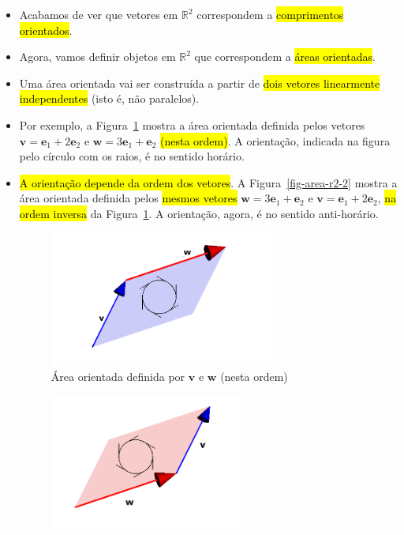 \documentclass[
  letterpaper,
  DIV=11,
  numbers=noendperiod]{scrreprt}
\begin{document}
\begin{itemize}
\item
  Acabamos de ver que vetores em $\mathbb{R}^2$ correspondem a
  {\hl{comprimentos orientados}}.
\item
  Agora, vamos definir objetos em $\mathbb{R}^2$ que correspondem a
  {\hl{áreas orientadas}}.
\item
  Uma área orientada vai ser construída a partir de {\hl{dois vetores
  linearmente independentes}} (isto é, não paralelos).
\item
  Por exemplo, a Figura~\ref{fig-area-r2} mostra a área orientada
  definida pelos vetores $\mathbf{v} = \mathbf{e}_{1} + 2\mathbf{e}_{2}$
  e $\mathbf{w} = 3\mathbf{e}_{1} + \mathbf{e}_{2}$ {\hl{(nesta
  ordem)}}. A orientação, indicada na figura pelo círculo com os raios,
  é no sentido horário.
\item
  {\hl{A orientação depende da ordem dos vetores}}. A
  Figura~\ref{fig-area-r2-2} mostra a área orientada definida pelos
  {\hl{mesmos vetores}} $\mathbf{w} = 3\mathbf{e}_{1} + \mathbf{e}_{2}$
  e $\mathbf{v} = \mathbf{e}_{1} + 2\mathbf{e}_{2}$, {\hl{na ordem
  inversa}} da Figura~\ref{fig-area-r2}. A orientação, agora, é no
  sentido anti-horário.

  \begin{figure}[htb]

  {\centering \includegraphics[width=0.7\textwidth,height=\textheight]{figures/fig-area-r2.png}

  }

  \caption{\label{fig-area-r2}Área orientada definida por $\mathbf{v}$ e
  $\mathbf{w}$ (nesta ordem)}

  \end{figure}

  \begin{figure}[htb]

  {\centering \includegraphics[width=0.6\textwidth,height=\textheight]{figures/fig-area-r2-2.png}

}
\end{figure}
\end{itemize}
\end{document}

